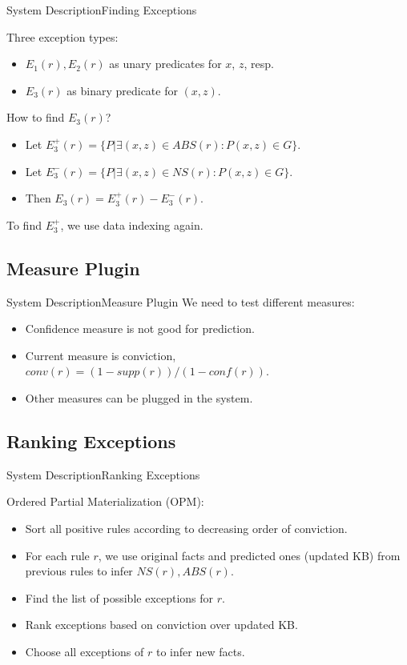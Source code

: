 \documentclass{beamer}
\begin{document}
\begin{frame}{System Description}{Finding Exceptions}

Three exception types:
\begin{itemize}
	\item $E_1(r), E_2(r)$ as unary predicates for $x$, $z$, resp.
	\item {
		$E_3(r)$ as binary predicate for $(x, z)$.
		\pause
	}
\end{itemize}

How to find $E_3(r)$?
\begin{itemize}
	\item Let $E_3^+(r) = \{P | \exists (x, z) \in ABS(r): P(x, z) \in G\}$.
	\item Let $E_3^-(r) = \{P | \exists (x, z) \in NS(r): P(x, z) \in G\}$.
	\item Then $E_3(r) = E_3^+(r) - E_3^-(r)$.
\end{itemize}

To find $E_3^+$, we use data indexing again.

\end{frame}

\subsection{Measure Plugin}

\begin{frame}{System Description}{Measure Plugin}
We need to test different measures:
\begin{itemize}
	\item Confidence measure is not good for prediction.
	\item Current measure is conviction, $conv(r) = (1 - supp(r)) / (1 - conf(r))$.
	\item Other measures can be plugged in the system.
\end{itemize}
\end{frame}

\subsection{Ranking Exceptions}

\begin{frame}{System Description}{Ranking Exceptions}

Ordered Partial Materialization (OPM):
\begin{itemize}
	\item Sort all positive rules according to decreasing order of conviction.
	\item For each rule $r$, we use original facts and predicted ones (updated KB) from previous rules to infer $NS(r), ABS(r)$.
	\item Find the list of possible exceptions for $r$.
	\item Rank exceptions based on conviction over updated KB.
	\item Choose all exceptions of $r$ to infer new facts.
\end{itemize}

\end{frame}
\end{document}
